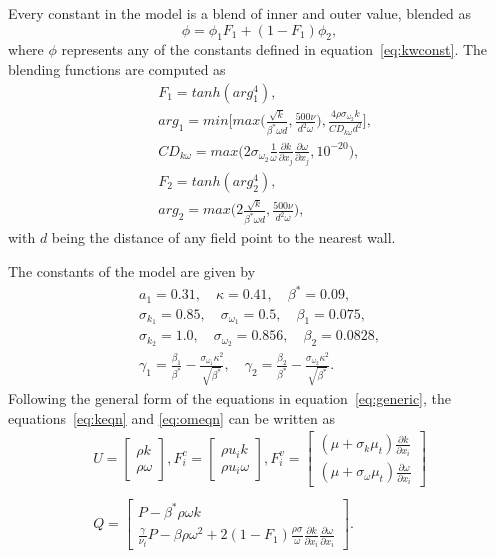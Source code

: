 Every constant in the model is a blend of inner and outer value, blended as
\begin{equation*}
    \phi = \phi_1 F_1 + (1 - F_1)\phi_2,
\end{equation*}
where $\phi$ represents any of the constants defined in equation~\ref{eq:kwconst}. The blending functions are computed as
\begin{align*}
    &F_1 = tanh(arg_1 ^4), \\
    &arg_1 = min\Bigg[max\bigg(\frac{\sqrt{k}}{\beta^* \omega d}, \frac{500\nu}{d^2 \omega}\bigg), 
                     \frac{4\rho\sigma_{\omega_2} k}{CD_{k\omega}d^2}\Bigg], \\
    &CD_{k\omega} = max\bigg(2\sigma_{\omega_2}\frac{1}{\omega}\frac{\partial k}{\partial x_j}\frac{\partial \omega}{\partial x_j} ,10^{-20} \bigg), \\
    &F_2 = tanh(arg_2 ^4), \\
    &arg_2 = max\Bigg(2\frac{\sqrt{k}}{\beta^* \omega d}, \frac{500\nu}{d^2 \omega}\Bigg),
\end{align*}
with $d$ being the distance of any field point to the nearest wall.

The constants of the model are given by
\begin{align}{}
a_1 = 0.31, \quad \kappa = 0.41, \quad  \beta^* = 0.09,  \nonumber\\
\sigma_{k_1} = 0.85, \quad \sigma_{\omega_1} = 0.5, \quad \beta_1 = 0.075, \nonumber\\
\sigma_{k_2} = 1.0, \quad \sigma_{\omega_2} = 0.856, \quad  \beta_2 = 0.0828, \nonumber\\
\gamma_1 = \frac{\beta_1}{\beta^*} - \frac{\sigma_{\omega_1}\kappa^2}{\sqrt{\beta^*}}, \quad \gamma_2 = \frac{\beta_2}{\beta^*} - \frac{\sigma_{\omega_2}\kappa^2}{\sqrt{\beta^*}} \label{eq:kwconst}.
\end{align}
Following the general form of the equations in equation~\ref{eq:generic}, the equations~\ref{eq:keqn} and \ref{eq:omeqn} can be written as
\begin{align}
    U=\begin{bmatrix}{}
    \rho k \\
    \rho\omega
    \end{bmatrix},
    F_i^c = \begin{bmatrix}{}
    \rho u_i k \\
    \rho u_i \omega
    \end{bmatrix},
    F^v_i = \begin{bmatrix}{}
    (\mu + \sigma_k \mu_t) \frac{\partial k}{\partial x_i} \\
    (\mu + \sigma_{\omega} \mu_t) \frac{\partial \omega}{\partial x_i}
    \end{bmatrix} \nonumber \\ \nonumber\\
    Q = \begin{bmatrix}{}
    P - \beta^* \rho\omega k \\
    \frac{\gamma}{\nu_t}P - \beta \rho \omega^2 + 2(1-F_1)\frac{\rho\sigma}{\omega}{\frac{\partial k}{\partial x_i}}{\frac{\partial \omega}{\partial x_i}}
    \end{bmatrix}.
\end{align}{}

